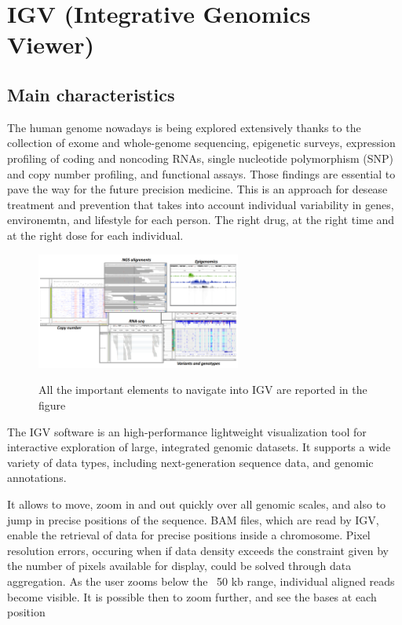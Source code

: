 \graphicspath{{chapters/IGVimages/}}

\chapter*{IGV (Integrative Genomics Viewer)}

\section*{Main characteristics}
The human genome nowadays is being explored extensively thanks to the collection
of exome and whole-genome sequencing, epigenetic surveys, expression profiling
of coding and noncoding RNAs, single nucleotide polymorphism (SNP) and copy
number profiling, and functional assays. Those findings are essential to pave the way for the future precision medicine. This is an approach
for desease treatment and prevention that takes into account individual
variability in genes, environemtn, and lifestyle for each person. The right
drug, at the right time and at the right dose for each individual. 

\begin{figure}
    \caption{All the important elements to navigate into IGV are reported in the figure}
    \centering
    \includegraphics[width=0.6\textwidth]{usagesIGV.PNG}
    \label{IGVsee}
\end{figure}

The IGV software is an high-performance lightweight visualization tool for interactive exploration
of large, integrated genomic datasets. It supports a wide variety of data types,
including next-generation sequence data, and genomic annotations.

It allows to move, zoom in and out quickly over all genomic scales, and also to
jump in precise positions of the sequence. BAM files, which are read by IGV,
enable the retrieval of data for precise positions inside a chromosome. Pixel
resolution errors, occuring when if data density exceeds the constraint given by
the number of pixels available for display, could be solved through data
aggregation. As the user zooms below the ~50 kb range, individual aligned reads
become visible. It is possible then to zoom further, and see the bases at each
position

